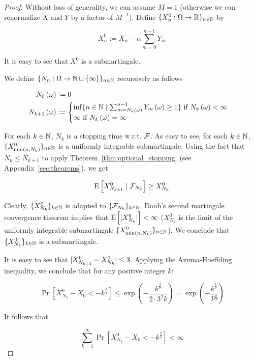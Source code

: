 \begin{proof}

Without loss of generality, we can assume ${M = 1}$ (otherwise we can renormalize ${X}$ and ${Y}$ by a factor of ${M^{-1}}$). Define ${\{X^0_n: \Omega \rightarrow \mathbb{R}\}_{n \in \mathbb{N}}}$ by

$$X^0_n := X_n - \alpha \sum_{m=0}^{n-1} Y_m$$

It is easy to see that ${X^0}$ is a submartingale.

We define ${\{N_n:\Omega \rightarrow \mathbb{N} \sqcup \{\infty\}\}_{n \in \mathbb{N}}}$ recursively as follows

\begin{align*}
N_0\left(\omega\right) &:= 0 \\ 
N_{k+1}\left(\omega\right) &:= \begin{cases}\inf \{n \in \mathbb{N} \mid \sum_{m=N_k\left(\omega\right)}^{n-1} Y_m\left(\omega\right) \geq 1\} \text{ if } N_k\left(\omega\right) < \infty\\\infty \text{ if } N_k\left(\omega\right) = \infty\end{cases}
\end{align*}

For each $k \in \mathbb{N}$, $N_k$ is a stopping time w.r.t. ${\mathcal{F}}$. As easy to see, for each $k \in \mathbb{N}$, ${\{X^0_{\min\left(n,N_k\right)}\}_{n \in \mathbb{N}}}$ is a uniformly integrable submartingale. Using the fact that ${N_{k} \leq N_{k+1}}$ to apply Theorem~\ref{thm:optional_stopping} (see Appendix~\ref{sec:theorems}), we get

$$\operatorname{E}\left[X^0_{N_{k+1}} \mid \mathcal{F}_{N_k}\right] \geq X^0_{N_{k}}$$

Clearly, ${\{X^0_{N_k}\}_{k \in \mathbb{N}}}$ is adapted to ${\{\mathcal{F}_{N_k}\}_{k \in \mathbb{N}}}$. Doob's second martingale convergence theorem implies that ${\operatorname{E}\left[\lvert X^0_{N_k} \rvert\right] < \infty}$ (${X^0_{N_k}}$ is the limit of the uniformly integrable submartingale ${\{X^0_{\min\left(n,N_k\right)}\}_{n \in \mathbb{N}}}$). We conclude that ${\{X^0_{N_k}\}_{k \in \mathbb{N}}}$ is a submartingale.

It is easy to see that ${\lvert X^0_{N_{k+1}}-X^0_{N_k} \rvert} \leq 3$. Applying the Azuma-Hoeffding inequality, we conclude that for any positive integer ${k}$:

$$\Pr\left[X^0_{N_k} - X_0 < -k^{\frac{3}{4}}\right] \leq \exp\left(-\frac{k^{\frac{3}{2}}}{2 \cdot 3^2k}\right)=\exp\left(-\frac{k^{\frac{1}{2}}}{18}\right)$$

It follows that

$$\sum_{k=1}^\infty \Pr\left[X^0_{N_k} - X_0 < -k^{\frac{3}{4}}\right] < \infty$$


\end{proof}

